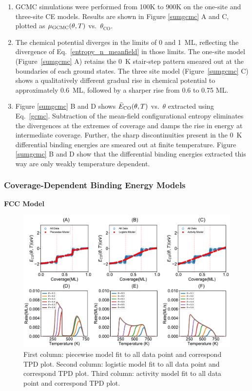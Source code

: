 \documentclass[11pt]{article}
\begin{document}
\begin{enumerate}
\item GCMC simulations were performed from 100K to 900K on the one-site and three-site CE models. Results are shown in Figure \ref{sumgcmc} A and C, plotted as $\mu_{\ce{GCMC}}(\theta,T)$ vs.\ $\theta_{\text{CO}}$. 
\item The chemical potential diverges in the limits of 0 and 1~ML, reflecting the divergence of Eq.~\ref{entropy_n_meanfield} in those limits. The one-site model (Figure~\ref{sumgcmc} A) retains the 0~K stair-step pattern smeared out at the boundaries of each ground states. The three site model (Figure~\ref{sumgcmc} C) shows a qualitatively different gradual rise in chemical potential to approximately 0.6~ML, followed by a sharper rise from 0.6 to 0.75 ML.
\item Figure \ref{sumgcmc} B and D shows $\bar{E}_{\ce{CO}}(\theta,T)$ vs.\ $\theta$ extracted using Eq.~\ref{gcmc}. Subtraction of the mean-field configurational entropy eliminates the divergences at the extremes of coverage and damps the rise in energy at intermediate coverage. Further, the sharp discontinuities present in the 0~K differential binding energies are smeared out at finite temperature. Figure \ref{sumgcmc} B and D show that the differential binding energies extracted this way are only weakly temperature dependent. 
\end{enumerate}

\clearpage
\subsubsection*{Coverage-Dependent Binding Energy Models }
\textbf{FCC Model} 

\begin{figure} [h]
\centering
\includegraphics[width=15cm]{Figure/1function.pdf}
\caption{First column: piecewise model fit to all data point and correspond TPD plot. Second column: logistic model fit to all data point and correspond TPD plot. Third column: activity model fit to all data point and correspond TPD plot.}
\label{1func}
\end{figure}
\end{document}
